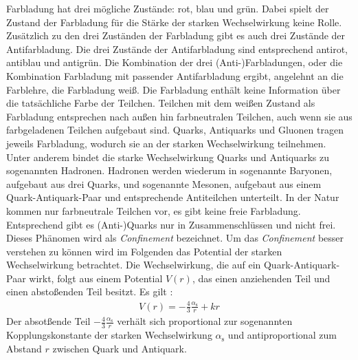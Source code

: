 Farbladung hat drei m\"ogliche Zust\"ande: rot, blau und gr\"un.
Dabei spielt der Zustand der Farbladung f\"ur die St\"arke der starken Wechselwirkung keine Rolle.
Zus\"atzlich zu den drei Zust\"anden der Farbladung gibt es auch drei Zust\"ande der Antifarbladung. 
Die drei Zust\"ande der Antifarbladung sind entsprechend antirot, antiblau und antigr\"un.
Die Kombination der drei (Anti-)Farbladungen, oder die Kombination Farbladung mit passender Antifarbladung ergibt, angelehnt an die Farblehre, die Farbladung wei{\ss}.
Die Farbladung enth\"alt keine Information \"uber die tats\"achliche Farbe der Teilchen.
Teilchen mit dem wei{\ss}en Zustand als Farbladung entsprechen nach au{\ss}en hin farbneutralen Teilchen, auch wenn sie aus farbgeladenen Teilchen aufgebaut sind.
\newline
Quarks, Antiquarks und Gluonen tragen jeweils Farbladung, wodurch sie an der starken Wechselwirkung teilnehmen.
Unter anderem bindet die starke Wechselwirkung Quarks und Antiquarks zu sogenannten Hadronen. %
Hadronen werden wiederum in sogenannte Baryonen, aufgebaut aus drei Quarks, und sogenannte Mesonen, aufgebaut aus einem Quark-Antiquark-Paar und entsprechende Antiteilchen unterteilt.
In der Natur kommen nur farbneutrale Teilchen vor, es gibt keine freie Farbladung.
Entsprechend gibt es (Anti-)Quarks nur in Zusammenschl\"ussen und nicht frei. 
Dieses Ph\"anomen wird als \textit{Confinement} bezeichnet.
Um das \textit{Confinement} besser verstehen zu k\"onnen wird im Folgenden das Potential der starken Wechselwirkung betrachtet.
\newline
Die Wechselwirkung, die auf ein Quark-Antiquark-Paar wirkt, folgt aus einem Potential $V(r)$, das einen anziehenden Teil und einen abstoßenden Teil besitzt.
Es gilt \cite{HennerSkript}:
\begin{align} \label{eq:Potential}
V(r) = -\frac{4}{3}\frac{\alpha_\text{s}}{r} + kr 
\end{align}
Der absot{\ss}ende Teil $-\frac{4}{3}\frac{\alpha_\text{s}}{r}$ verh\"alt sich proportional zur sogenannten Kopplungskonstante der starken Wechselwirkung $\alpha_{\text{s}}$ und antiproportional zum Abstand $r$ zwischen Quark und Antiquark.
